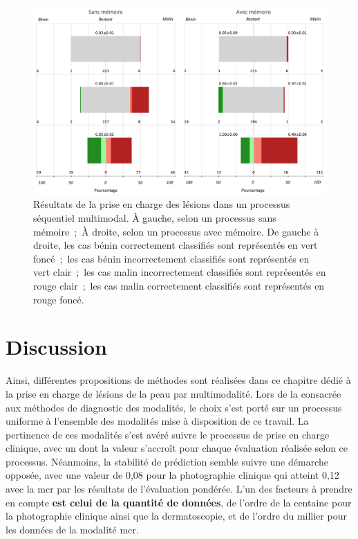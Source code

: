 \begin{figure}[H]
    \centering
    \includegraphics[width=0.9\linewidth]{contents/chapter_8/resources/results_lesions_management.pdf}
    \caption{Résultats de la prise en charge des lésions dans un processus séquentiel multimodal. À gauche, selon un processus sans mémoire~;~À droite, selon un processus avec mémoire. De gauche à droite, les cas bénin correctement classifiés sont représentés en vert foncé~;~les cas bénin incorrectement classifiés sont représentés en vert clair~;~les cas malin incorrectement classifiés sont représentés en rouge clair~;~les cas malin correctement classifiés sont représentés en rouge foncé.}
    \label{fig:results_lesions_management}
\end{figure}\par

\section{Discussion}
Ainsi, différentes propositions de méthodes sont réalisées dans ce chapitre dédié à la prise en charge de lésions de la peau par multimodalité. Lors de la  consacrée aux méthodes de diagnostic des modalités, le choix s'est porté sur un processus uniforme à l'ensemble des modalités mise à disposition de ce travail. La pertinence de ces modalités s'est avéré suivre le processus de prise en charge clinique, avec un \fscore{} dont la valeur s'accroît pour chaque évaluation réalisée selon ce processus. Néanmoins, la stabilité de prédiction semble suivre une démarche opposée, avec une valeur de 0,08 pour la photographie clinique qui atteint 0,12 avec la \gls{mcr} par les résultats de l'évaluation pondérée. L'un des facteurs à prendre en compte \textbf{est celui de la quantité de données}, de l'ordre de la centaine pour la photographie clinique ainsi que la dermatoscopie, et de l'ordre du millier pour les données de la modalité \gls{mcr}.\par

